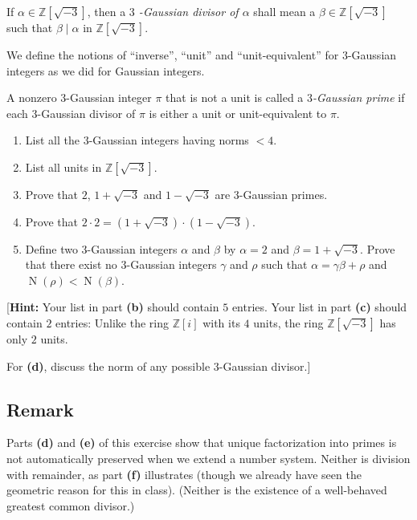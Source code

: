 \documentclass[paper=a4, fontsize=12pt]{scrartcl}%
\theoremstyle{plainsl}
\theoremstyle{definition}
\theoremstyle{remark}
\begin{document}
If $\alpha\in\mathbb{Z}\left[  \sqrt{-3} \right]  $, then a \textit{$3$%
-Gaussian divisor of $\alpha$} shall mean a $\beta\in\mathbb{Z}\left[
\sqrt{-3} \right]  $ such that $\beta\mid\alpha$ in $\mathbb{Z}\left[
\sqrt{-3} \right]  $.

We define the notions of ``inverse'', ``unit'' and ``unit-equivalent'' for $3
$-Gaussian integers as we did for Gaussian integers.

A nonzero $3$-Gaussian integer $\pi$ that is not a unit is called a
\textit{$3$-Gaussian prime} if each $3$-Gaussian divisor of $\pi$ is either a
unit or unit-equivalent to $\pi$.

\begin{enumerate}
\item[\textbf{(b)}] List all the $3$-Gaussian integers having norms $< 4$.

\item[\textbf{(c)}] List all units in $\mathbb{Z}\left[  \sqrt{-3} \right]  $.

\item[\textbf{(d)}] Prove that $2$, $1 + \sqrt{-3}$ and $1 - \sqrt{-3}$ are
$3$-Gaussian primes.

\item[\textbf{(e)}] Prove that $2 \cdot2 = \left(  1 + \sqrt{-3} \right)
\cdot\left(  1 - \sqrt{-3} \right)  $.

\item[\textbf{(f)}] Define two $3$-Gaussian integers $\alpha$ and $\beta$ by
$\alpha= 2$ and $\beta= 1 + \sqrt{-3}$. Prove that there exist no $3$-Gaussian
integers $\gamma$ and $\rho$ such that $\alpha= \gamma\beta+ \rho$ and
$\operatorname{N}\left(  \rho\right)  < \operatorname{N}\left(  \beta\right)
$.
\end{enumerate}

[\textbf{Hint:} Your list in part \textbf{(b)} should contain $5$ entries.
Your list in part \textbf{(c)} should contain $2$ entries: Unlike the ring
$\mathbb{Z}\left[  i \right]  $ with its $4$ units, the ring $\mathbb{Z}%
\left[  \sqrt{-3} \right]  $ has only $2$ units.

For \textbf{(d)}, discuss the norm of any possible $3$-Gaussian divisor.]

\subsection{Remark}

Parts \textbf{(d)} and \textbf{(e)} of this exercise show that unique
factorization into primes is not automatically preserved when we extend a
number system. Neither is division with remainder, as part \textbf{(f)}
illustrates (though we already have seen the geometric reason for this in
class). (Neither is the existence of a well-behaved greatest common divisor.)
\end{document}

